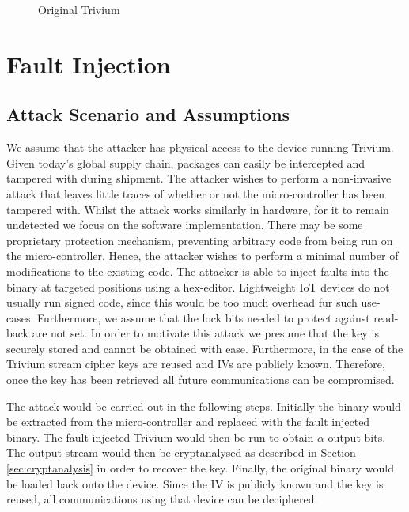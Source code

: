 \documentclass[conference]{IEEEtran}
\begin{document}
\begin{figure}[H]
\centering

\caption{Original Trivium}
\label{fig:original}
\end{figure}

\section{Fault Injection}\label{sec:fault-inj}

\subsection{Attack Scenario and Assumptions}\label{sec:fault}

We assume that the attacker has physical access to the device running Trivium. Given today's global supply chain, packages can easily be intercepted and tampered with during shipment. The attacker wishes to perform a non-invasive attack that leaves little traces of whether or not the micro-controller has been tampered with. Whilst the attack works similarly in hardware, for it to remain undetected we focus on the software implementation. There may be some proprietary protection mechanism, preventing arbitrary code from being run on the micro-controller. Hence, the attacker wishes to perform a minimal number of modifications to the existing code. The attacker is able to inject faults into the binary at targeted positions using a hex-editor. Lightweight IoT devices do not usually run signed code, since this would be too much overhead fur such use-cases. Furthermore, we assume that the lock bits needed to protect against read-back are not set. In order to motivate this attack we presume that the key is securely stored and cannot be obtained with ease. Furthermore,
in the case of the Trivium stream cipher keys are reused and IVs are publicly known. Therefore, once the key has been retrieved all future communications can be compromised. 

The attack would be carried out in the following steps. Initially the binary would be extracted from the micro-controller and replaced with the fault injected binary. The fault injected Trivium would then be run to obtain $\alpha$ output bits. The output stream would then be cryptanalysed as described in Section \ref{sec:cryptanalysis} in order to recover the key. Finally, the original binary would be loaded back onto the device. Since the IV is publicly known and the key is reused, all communications using that device can be deciphered.
\end{document}
